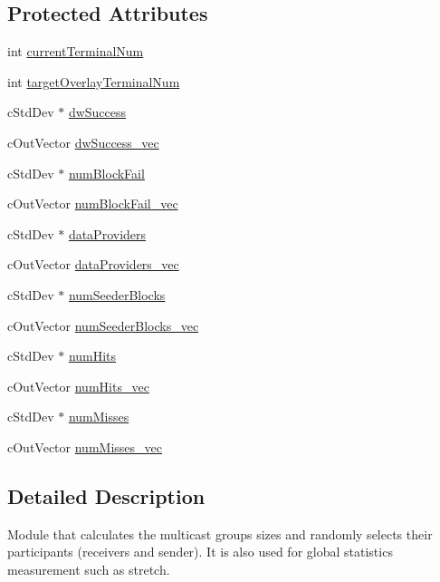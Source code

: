 \subsection*{Protected Attributes}
\begin{DoxyCompactItemize}
\item 
int \hyperlink{classBTStatistics_aa9663e0a709e2bbe2b4859acc0c2b72b}{current\+Terminal\+Num}
\item 
int \hyperlink{classBTStatistics_a85c632cdb7b255da257b65e5370000b4}{target\+Overlay\+Terminal\+Num}
\item 
c\+Std\+Dev $\ast$ \hyperlink{classBTStatistics_a1342bc01b82315391b10d5c0560b4ee2}{dw\+Success}
\item 
c\+Out\+Vector \hyperlink{classBTStatistics_a3bf710ae5862b7c6b171a70ed570dec4}{dw\+Success\+\_\+vec}
\item 
c\+Std\+Dev $\ast$ \hyperlink{classBTStatistics_ad6701a3f8b96df4e7535020f9f57c8e6}{num\+Block\+Fail}
\item 
c\+Out\+Vector \hyperlink{classBTStatistics_ab9542f9a68503485c303d5d6667c8a44}{num\+Block\+Fail\+\_\+vec}
\item 
c\+Std\+Dev $\ast$ \hyperlink{classBTStatistics_a7ea82ebc767d80852b4d4857cc86c614}{data\+Providers}
\item 
c\+Out\+Vector \hyperlink{classBTStatistics_aa97b13fd73e1120a01c050fdc05e1eb0}{data\+Providers\+\_\+vec}
\item 
c\+Std\+Dev $\ast$ \hyperlink{classBTStatistics_ab0754ded61dc5b410ba3345415eb0cbe}{num\+Seeder\+Blocks}
\item 
c\+Out\+Vector \hyperlink{classBTStatistics_a6ff3cdec7cc91846c2482ebf1a1ebfe6}{num\+Seeder\+Blocks\+\_\+vec}
\item 
c\+Std\+Dev $\ast$ \hyperlink{classBTStatistics_ac24ef388a8ae35c9e4427dc146db48be}{num\+Hits}
\item 
c\+Out\+Vector \hyperlink{classBTStatistics_af717deda266c06bcbb0395b4e4d70908}{num\+Hits\+\_\+vec}
\item 
c\+Std\+Dev $\ast$ \hyperlink{classBTStatistics_aa1fc0cbf7c6596091752c923da48b334}{num\+Misses}
\item 
c\+Out\+Vector \hyperlink{classBTStatistics_aa2be128331e707564905616f8be6e113}{num\+Misses\+\_\+vec}
\end{DoxyCompactItemize}


\subsection{Detailed Description}
Module that calculates the multicast groups sizes and randomly selects their participants (receivers and sender). It is also used for global statistics measurement such as stretch.

